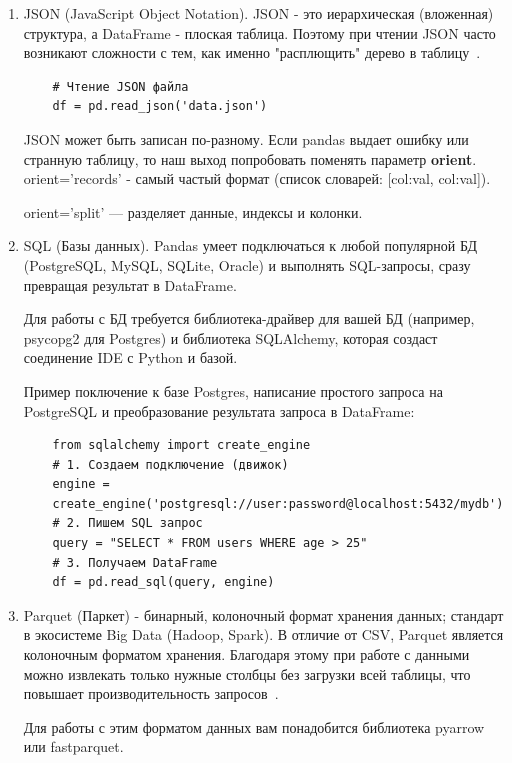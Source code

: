 \documentclass[pract]{SCWorks}
\begin{document}
\begin{enumerate}
    \item JSON (JavaScript Object Notation). JSON - это иерархическая (вложенная) структура, а DataFrame - 
    плоская таблица. Поэтому при чтении JSON часто возникают сложности с тем, как именно "расплющить" дерево в таблицу~\cite{pandas-docs}.

    \begin{verbatim}
    # Чтение JSON файла
    df = pd.read_json('data.json')
    \end{verbatim}

    JSON может быть записан по-разному. Если pandas выдает ошибку или странную таблицу, то наш выход попробовать
    поменять параметр \textbf{orient}.
    orient='records' - самый частый формат (список словарей: [{col:val}, {col:val}]).
    
    orient='split' — разделяет данные, индексы и колонки.
    \item SQL (Базы данных). Pandas умеет подключаться к любой популярной БД (PostgreSQL, MySQL, SQLite, Oracle) 
    и выполнять SQL-запросы, сразу превращая результат в DataFrame.

    Для работы с БД требуется библиотека-драйвер для вашей БД (например, psycopg2 для Postgres) и библиотека
    SQLAlchemy, которая создаст соединение IDE с Python и базой.

    Пример поключение к базе Postgres, написание простого запроса на PostgreSQL и 
    преобразование результата запроса в DataFrame:

    \begin{verbatim}
    from sqlalchemy import create_engine
    # 1. Создаем подключение (движок)
    engine = 
    create_engine('postgresql://user:password@localhost:5432/mydb')
    # 2. Пишем SQL запрос
    query = "SELECT * FROM users WHERE age > 25"
    # 3. Получаем DataFrame
    df = pd.read_sql(query, engine)
    \end{verbatim}
    \item Parquet (Паркет) - бинарный, колоночный формат хранения данных; стандарт в экосистеме Big Data (Hadoop, Spark).
    В отличие от CSV, Parquet является колоночным форматом хранения. Благодаря этому при работе с данными 
    можно извлекать только нужные столбцы без загрузки всей таблицы, что повышает производительность запросов~\cite{pandas-docs}.

    Для работы с этим форматом данных вам понадобится библиотека pyarrow или fastparquet.
\end{enumerate}
\end{document}
